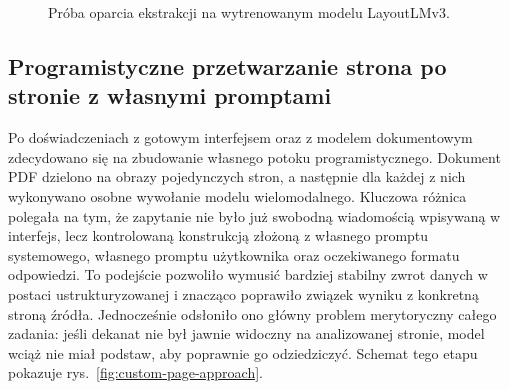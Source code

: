 \begin{figure}[htbp]
\centering
{}
\caption{Próba oparcia ekstrakcji na wytrenowanym modelu LayoutLMv3.}
\label{fig:layoutlmv3-approach}
\end{figure}

\subsection{Programistyczne przetwarzanie strona po stronie z własnymi promptami}\label{subsec:strona_bez_kontekstu}

Po doświadczeniach z gotowym interfejsem oraz z modelem dokumentowym zdecydowano się na zbudowanie własnego potoku programistycznego.
Dokument PDF dzielono na obrazy pojedynczych stron, a następnie dla każdej z nich wykonywano osobne wywołanie modelu wielomodalnego.
Kluczowa różnica polegała na tym, że zapytanie nie było już swobodną wiadomością wpisywaną w interfejs, lecz kontrolowaną konstrukcją złożoną z własnego promptu systemowego, własnego promptu użytkownika oraz oczekiwanego formatu odpowiedzi.
To podejście pozwoliło wymusić bardziej stabilny zwrot danych w postaci ustrukturyzowanej i znacząco poprawiło związek wyniku z konkretną stroną źródła.
Jednocześnie odsłoniło ono główny problem merytoryczny całego zadania: jeśli dekanat nie był jawnie widoczny na analizowanej stronie, model wciąż nie miał podstaw, aby poprawnie go odziedziczyć.
Schemat tego etapu pokazuje rys.~\ref{fig:custom-page-approach}.

